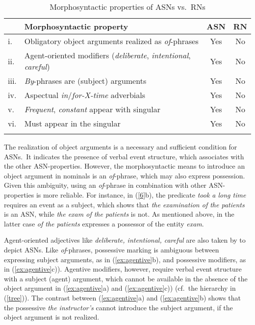 \documentclass[output=paper]{langsci/langscibook}
\begin{document}
\begin{table}
\caption{Morphosyntactic properties of ASNs vs.\ RNs\label{tab:1:ASN:RN}}
\begin{tabular}{llcc}
\lsptoprule
& Morphosyntactic property & ASN & RN\\\midrule
i. & Obligatory object arguments realized as \textit{of}-phrases & Yes & No \\ 
ii. & Agent-oriented modifiers (\textit{deliberate}, \textit{intentional}, \textit{careful}) & Yes & No\\ 
iii. & \textit{By}-phrases are (subject) arguments &Yes & No\\ 
iv. & Aspectual \textit{in}/\textit{for-X-time} adverbials & Yes & No\\ 
v. &  \textit{Frequent}, \textit{constant} appear with singular & Yes & No\\ 
vi. & Must appear in the singular & Yes & No\\
\lspbottomrule
\end{tabular}
\end{table}

 The realization of object arguments is a necessary and sufficient condition for ASNs.\ It indicates the presence of verbal event structure, which associates with the other ASN-properties. However, the morphosyntactic means to introduce an object argument in nominals is an \textit{of}-phrase, which may also express possession. Given this ambiguity, using an  \textit{of}-phrase in combination with other ASN-properties is more reliable. For instance, in  (\ref{6}b), the predicate \textit{took a long time} requires an event as a subject, which shows that \textit{the examination of the patients} is an ASN, while \textit{the exam of the patients} is not.
As mentioned above, in the latter case \textit{of the patients} expresses a possessor of the entity \textit{exam}.

Agent-oriented adjectives like \textit{deliberate, intentional, careful} are also taken by \citet[51--52]{grimshaw:90} to depict ASNs.  Like \textit{of}-phrases, possessive marking is ambiguous between expressing subject arguments, as in (\ref{ex:agentive}b), and possessive modifiers,  as in (\ref{ex:agentive}c)). Agentive modifiers, however, require verbal event structure with a subject (agent) argument, which cannot be available in the absence of the object argument in (\ref{ex:agentive}a) and (\ref{ex:agentive}c)) (cf.~the hierarchy in (\ref{tree})). The contrast between (\ref{ex:agentive}a) and (\ref{ex:agentive}b) shows that the possessive \textit{the instructor's} cannot introduce the subject argument, if the object argument is not realized.
\end{document}
